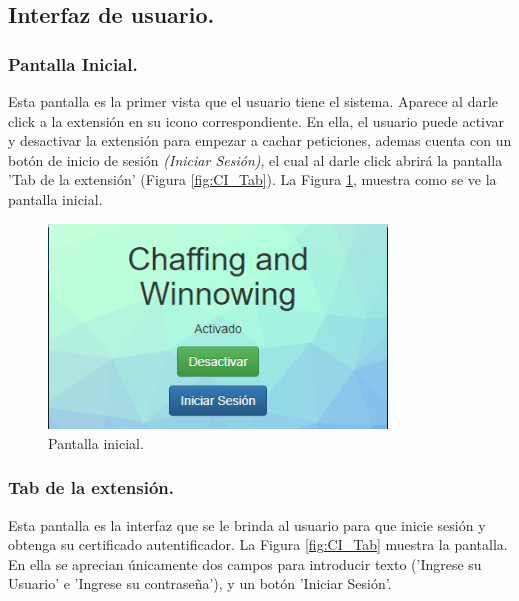 \documentclass[12pt, a4paper, titlepage]{report}
\begin{document}
    		\subsection{Interfaz de usuario.}
                
                \subsubsection{Pantalla Inicial.}
                Esta pantalla es la primer vista que el usuario tiene el sistema. Aparece al darle click a la extensión en su icono correspondiente. En ella, el usuario puede activar y desactivar la extensión para empezar a cachar peticiones, ademas cuenta con un botón de inicio de sesión \textit{(Iniciar Sesión)}, el cual al darle click abrirá la pantalla 'Tab de la extensión' (Figura \ref{fig:CI_Tab}). La Figura \ref{fig:CI_PantallaPrincipal}, muestra como se ve la pantalla inicial.
                
    		    \begin{figure}[H]
    				\begin{center}	\includegraphics[width=9cm]{./imagenes/Disenio/Componente_1/UI_inicio.PNG}
    					\caption{Pantalla inicial.}
    					\label{fig:CI_PantallaPrincipal}
    				\end{center}
    			\end{figure}
    			
    			\subsubsection{Tab de la extensión.}
    			Esta pantalla es la interfaz que se le brinda al usuario para que inicie sesión y obtenga su certificado autentificador. La Figura \ref{fig:CI_Tab} muestra la pantalla. En ella se aprecian únicamente dos campos para introducir texto ('Ingrese su Usuario' e 'Ingrese su contraseña'), y un botón 'Iniciar Sesión'.
    			  
\end{document}

